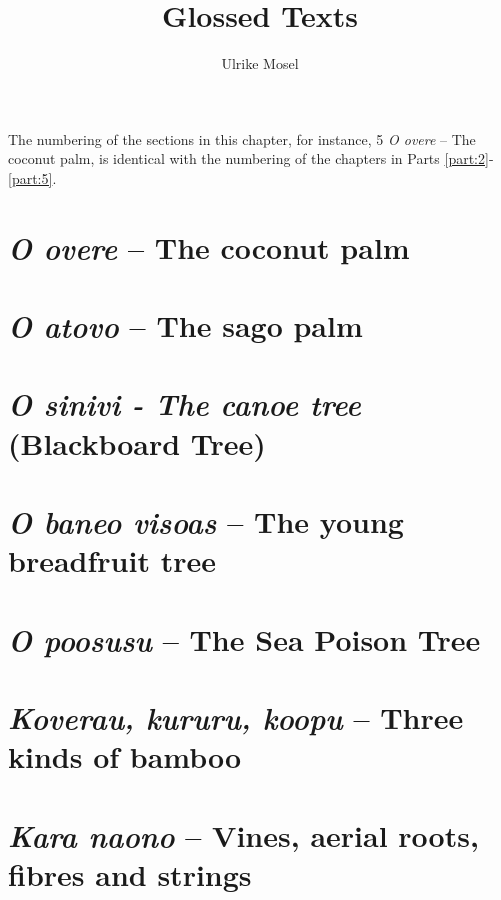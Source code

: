 \documentclass[output=paper]{langscibook}
\title{Glossed Texts}
\author{Ulrike Mosel}
\begin{document}
\maketitle
The numbering of the sections in this chapter, for instance, 5 \textit{O overe} – The coconut palm, is identical with the numbering of the chapters in Parts \ref{part:2}-\ref{part:5}.
\setcounter{section}{4}\section{\textit{O overe} – The coconut palm}

\setcounter{equation}{0}\cleardoublepage\section{\textit{O atovo} – The sago palm}

\setcounter{equation}{0}\cleardoublepage\section{\textit{O sinivi - The canoe tree} (Blackboard Tree)}

\setcounter{equation}{0}\cleardoublepage\section{\textit{O baneo visoas} – The young breadfruit tree}

\setcounter{equation}{0}\cleardoublepage\section{\textit{O poosusu} – The Sea Poison Tree}

\setcounter{equation}{0}\cleardoublepage\section{\textit{Koverau, kururu, koopu} – Three kinds of bamboo}

\setcounter{equation}{0}\cleardoublepage\section{\textit{Kara naono} – Vines, aerial roots, fibres and strings}
\end{document}
